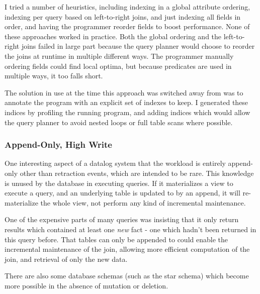 I tried a number of heuristics, including indexing in a global attribute ordering, indexing per query based on left-to-right joins, and just indexing all fields in order, and having the programmer reorder fields to boost performance.
None of these approaches worked in practice.
Both the global ordering and the left-to-right joins failed in large part because the query planner would choose to reorder the joins at runtime in multiple different ways.
The programmer manually ordering fields could find local optima, but because predicates are used in multiple ways, it too falls short.

The solution in use at the time this approach was switched away from was to annotate the program with an explicit set of indexes to keep.
I generated these indices by profiling the running program, and adding indices which would allow the query planner to avoid nested loops or full table scans where possible.

\subsubsection{Append-Only, High Write}
One interesting aspect of a datalog system that the workload is entirely append-only other than retraction events, which are intended to be rare.
This knowledge is unused by the database in executing queries.
If it materializes a view to execute a query, and an underlying table is updated to by an append, it will re-materialize the whole view, not perform any kind of incremental maintenance.

One of the expensive parts of many queries was insisting that it only return results which contained at least one \emph{new} fact - one which hadn't been returned in this query before.
That tables can only be appended to could enable the incremental maintenance of the join, allowing more efficient computation of the join, and retrieval of only the new data.

There are also some database schemas (such as the star schema) which become more possible in the absence of mutation or deletion.
